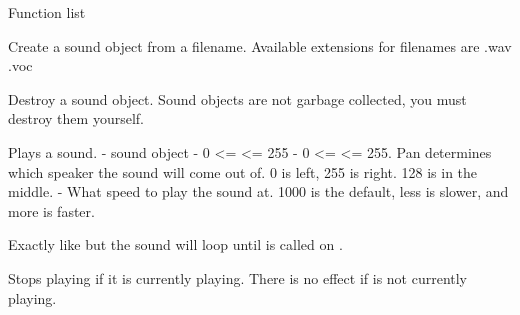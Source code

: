 
Function list



Create a sound object from a filename. Available extensions for filenames are
  .wav
  .voc


Destroy a sound object. Sound objects are not garbage collected, you must destroy them yourself.


Plays a sound.\newline\newline
   - sound object\newline
   - 0 <=  <= 255\newline
   - 0 <=  <= 255. Pan determines which speaker the sound will come out of. 0 is left, 255 is right. 128 is in the middle.\newline
   - What speed to play the sound at. 1000 is the default, less is slower, and more is faster.


Exactly like  but the sound will loop until  is called on .


Stops playing  if it is currently playing. There is no effect if  is not currently playing.


